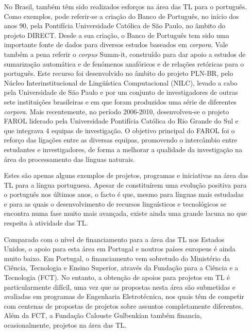 \documentclass[]{../metanetpaper}
\begin{document}
\begin{multicols}{2}
No Brasil, também têm sido realizados esforços na área das TL para o português. Como exemplos, pode referir-se a criação do Banco de Português, no início dos anos 90, pela Pontifícia Universidade Católica de São Paulo, no âmbito do projeto DIRECT. Desde a sua criação, o Banco de Português tem sido uma importante fonte de dados para diversos estudos baseados em \textit{corpora}. Vale também a pena referir o \textit{corpus} Summ-it, construído para dar apoio a estudos de sumarização automática e de fenómenos anafóricos e de relações retóricas para o português. Este recurso foi desenvolvido no âmbito do projeto PLN-BR, pelo Núcleo Interinstitucional de Lingüística Computacional (NILC), levado a cabo pela Universidade de São Paulo e por um conjunto de investigadores de outras sete instituições brasileiras e em que foram produzidos uma série de diferentes \textit{corpora}. Mais recentemente, no período 2006-2010, desenvolveu-se o projeto FAROL liderado pela Universidade Pontifícia Católica do Rio Grande do Sul e que integrava 4 equipas de investigação. O objetivo principal do FAROL foi o reforço das ligações entre as diversas equipas, promovendo o intercâmbio entre estudantes e investigadores, de forma a melhorar a qualidade da investigação na área do processamento das línguas naturais.

Estes são apenas alguns exemplos de projetos, programas e iniciativas na área das TL para a língua portuguesa. Apesar de constituírem uma evolução positiva para o português nos últimos anos, o facto é que, mesmo para línguas mais estudadas e para as quais o desenvolvimento de recursos linguísticos e tecnológicos se encontra numa fase muito mais avançada, existe ainda uma grande lacuna no que res\-pei\-ta à atividade das TL.

Comparado com o nível de financiamento para a área das TL nos Estados Unidos, o apoio para esta área em Portugal e noutros países europeus é ainda muito baixo. Em Portugal, o financiamento vem sobretudo do Ministério da Ciência, Tecnologia e Ensino Superior, através da Fundação para a Ciência e a Tecnologia (FCT). No entanto, a obtenção de apoios para projetos em TL é particularmente difícil, uma vez que as propostas nesta área são submetidas e avaliadas em programas de Engenharia Eletrotécnica, nos quais têm de competir com centenas de propostas de projetos sobre assuntos completamente diferentes. Além da FCT, a Fundação Calouste Gulbenkian também financia, ocasionalmente, projetos na área das TL.


\end{multicols}
\end{document}
